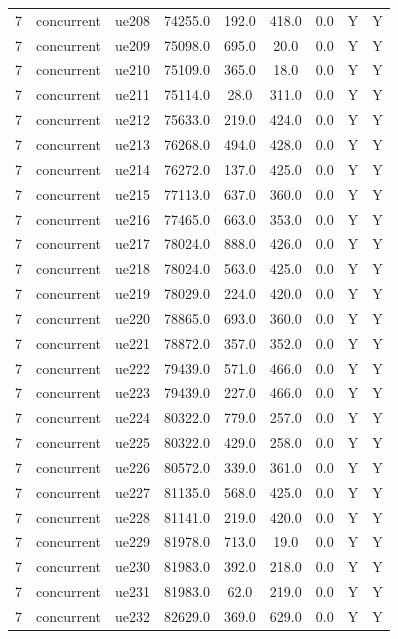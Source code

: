 \begin{table}[ht]
\begin{tabular}{|c|c|c|c|c|c|c|c|c|}
7 & concurrent & ue208 & 74255.0 & 192.0 & 418.0 & 0.0 & Y & Y \\
7 & concurrent & ue209 & 75098.0 & 695.0 & 20.0 & 0.0 & Y & Y \\
7 & concurrent & ue210 & 75109.0 & 365.0 & 18.0 & 0.0 & Y & Y \\
7 & concurrent & ue211 & 75114.0 & 28.0 & 311.0 & 0.0 & Y & Y \\
7 & concurrent & ue212 & 75633.0 & 219.0 & 424.0 & 0.0 & Y & Y \\
7 & concurrent & ue213 & 76268.0 & 494.0 & 428.0 & 0.0 & Y & Y \\
7 & concurrent & ue214 & 76272.0 & 137.0 & 425.0 & 0.0 & Y & Y \\
7 & concurrent & ue215 & 77113.0 & 637.0 & 360.0 & 0.0 & Y & Y \\
7 & concurrent & ue216 & 77465.0 & 663.0 & 353.0 & 0.0 & Y & Y \\
7 & concurrent & ue217 & 78024.0 & 888.0 & 426.0 & 0.0 & Y & Y \\
7 & concurrent & ue218 & 78024.0 & 563.0 & 425.0 & 0.0 & Y & Y \\
7 & concurrent & ue219 & 78029.0 & 224.0 & 420.0 & 0.0 & Y & Y \\
7 & concurrent & ue220 & 78865.0 & 693.0 & 360.0 & 0.0 & Y & Y \\
7 & concurrent & ue221 & 78872.0 & 357.0 & 352.0 & 0.0 & Y & Y \\
7 & concurrent & ue222 & 79439.0 & 571.0 & 466.0 & 0.0 & Y & Y \\
7 & concurrent & ue223 & 79439.0 & 227.0 & 466.0 & 0.0 & Y & Y \\
7 & concurrent & ue224 & 80322.0 & 779.0 & 257.0 & 0.0 & Y & Y \\
7 & concurrent & ue225 & 80322.0 & 429.0 & 258.0 & 0.0 & Y & Y \\
7 & concurrent & ue226 & 80572.0 & 339.0 & 361.0 & 0.0 & Y & Y \\
7 & concurrent & ue227 & 81135.0 & 568.0 & 425.0 & 0.0 & Y & Y \\
7 & concurrent & ue228 & 81141.0 & 219.0 & 420.0 & 0.0 & Y & Y \\
7 & concurrent & ue229 & 81978.0 & 713.0 & 19.0 & 0.0 & Y & Y \\
7 & concurrent & ue230 & 81983.0 & 392.0 & 218.0 & 0.0 & Y & Y \\
7 & concurrent & ue231 & 81983.0 & 62.0 & 219.0 & 0.0 & Y & Y \\
7 & concurrent & ue232 & 82629.0 & 369.0 & 629.0 & 0.0 & Y & Y \\

\end{tabular}
\end{table}
